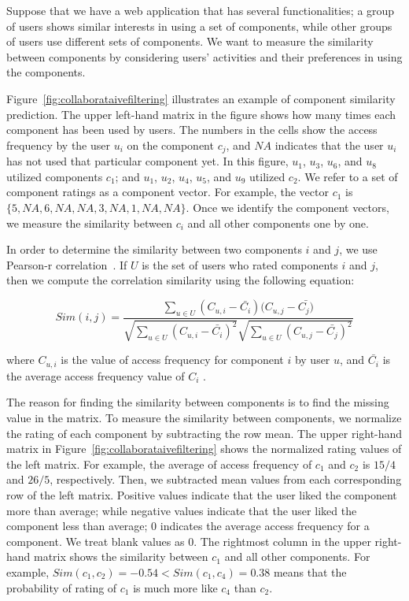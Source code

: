 Suppose that we have a web application that has several functionalities; 
a group of users shows similar interests in using a set of components,
while other groups of users use different sets of components. 
We want to measure the similarity between components by considering users' activities 
and their preferences in using the components.
 
Figure~\ref{fig:collaborataivefiltering} illustrates an example of
component similarity prediction. The upper left-hand matrix in the figure shows 
how many times each component has been used by users. 
The numbers in the cells show the access frequency by the
user $u_{i}$ on the component $c_{j}$, 
and $NA$ indicates that the user $u_{i}$ has not used that 
particular component yet. In this figure, $u_{1}$, $u_{3}$, $u_{6}$, and $u_{8}$ 
utilized components $c_{1}$; and $u_{1}$, $u_{2}$, $u_{4}$, $u_{5}$, and $u_{9}$ 
utilized $c_{2}$. 
We refer to a set of component ratings as a component vector.
For example, the vector $c_1$ is $\{5, NA, 6, NA, NA, 3, NA, 1, NA, NA\}$. 
Once we identify the component vectors, we measure the similarity 
between $c_{i}$ and all other components one by one. 

In order to determine the similarity between two components $i$ and $j$, we use
Pearson-r correlation~\cite{recom}.
If $U$ is the set of users who rated components $i$ and $j$, then we compute
the correlation similarity using the following equation:

\vspace*{-3pt}
\[
{Sim (i,j) = \frac {\sum_{u\in {U}}(C_{u,i} - \bar{C_i})(C_{u,j} - \bar{C_j)}}
	{ \sqrt{\sum_{u\in {U}}({C_{u,i} - \bar{C_i}})^{2}}
		{ \sqrt{\sum_{u\in {U}}({C_{u,j} - \bar{C_j}})^{2}}}}}	
\]

where $C_{u,i}$ is the value of access frequency for component $i$ by user $u$, and
$\bar{C_i}$ is the average access frequency value of $C_i$ . 

The reason for finding the similarity between components is to find the missing 
value in the matrix. To measure the similarity between components, 
we normalize the rating of each component by subtracting the row mean. 
The upper right-hand matrix in Figure~\ref{fig:collaborataivefiltering} shows the normalized
rating values of the left matrix. 
For example, the average of access frequency of $c_{1}$ and $c_{2}$  is $15/4$ and $26/5$, respectively.
Then, we subtracted mean values from each corresponding row of the left matrix.  
Positive values indicate that the user liked the component more than average;
while negative values
indicate that the user liked the component less than average; 0 indicates the average access 
frequency for a component. 
We treat blank values as 0.
The rightmost column in the upper right-hand matrix shows the similarity 
between $c_{1}$ and all other
components. For example, $Sim(c_{1},c_{2})= -0.54 < Sim(c_{1},c_{4})= 0.38$ means
that the probability of rating of $c_{1}$ is much more like $c_{4}$ than $c_{2}$.  

